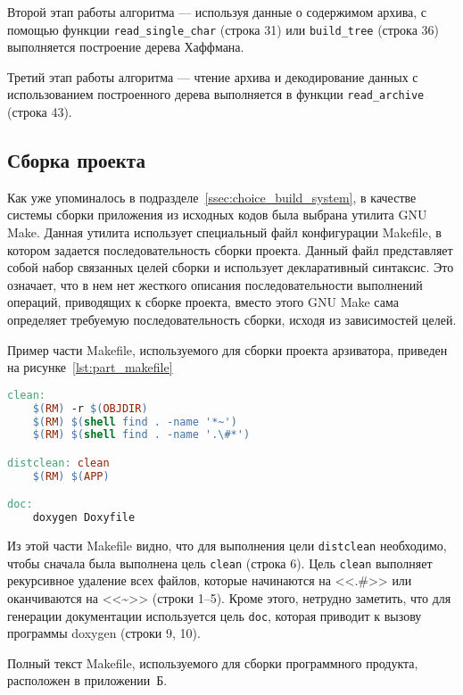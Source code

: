 Второй этап работы алгоритма --- используя данные о содержимом архива,
с помощью функции \texttt{read\_single\_char} (строка 31) или
\texttt{build\_tree} (строка 36) выполняется построение дерева Хаффмана.

Третий этап работы алгоритма --- чтение архива и декодирование данных
с использованием построенного дерева выполняется в функции \texttt{read\_archive}
(строка 43). 

\subsection{Сборка проекта}

Как уже упоминалось в подразделе~\ref{ssec:choice_build_system},
в качестве системы сборки приложения из исходных кодов была выбрана утилита
GNU Make. Данная утилита использует специальный файл конфигурации Makefile,
в котором задается последовательность сборки проекта.
Данный файл представляет собой набор связанных целей сборки и 
использует декларативный синтаксис. 
Это означает, что в нем нет жесткого описания последовательности 
выполнений операций, приводящих к сборке проекта, 
вместо этого GNU Make сама определяет требуемую последовательность сборки, 
исходя из зависимостей целей.

Пример части Makefile, используемого для сборки проекта арзиватора,
приведен на рисунке~\ref{lst:part_makefile}

\begin{lstlisting}[basicstyle=\scriptsize\ttfamily,
                   numberstyle=\scriptsize\ttfamily,
                   xleftmargin=7mm,
                   language=make,caption=Пример Makefile сборки проекта,
                   label=lst:part_makefile]
clean:
	$(RM) -r $(OBJDIR)
	$(RM) $(shell find . -name '*~')
	$(RM) $(shell find . -name '.\#*')

distclean: clean
	$(RM) $(APP)

doc: 
	doxygen Doxyfile
\end{lstlisting}

Из этой части Makefile видно, что для выполнения цели \texttt{distclean}
необходимо, чтобы сначала была выполнена цель \texttt{clean} (строка 6).
Цель \texttt{clean} выполняет рекурсивное удаление всех файлов, 
которые начинаются на <<.\#>> или оканчиваются на <<\textasciitilde>> 
(строки 1--5). 
Кроме этого, нетрудно заметить, что для генерации документации используется 
цель \texttt{doc}, которая приводит к вызову программы doxygen (строки 9, 10).

Полный текст Makefile, используемого для сборки программного продукта, 
расположен в приложении~Б.
